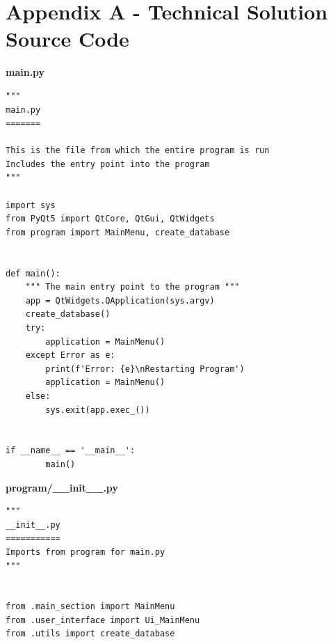 \documentclass[12pt]{article}
\begin{document}
\clearpage

\section{Appendix A - Technical Solution Source Code}
\textbf{main.py}

\begin{lstlisting}
"""
main.py
=======

This is the file from which the entire program is run
Includes the entry point into the program
"""

import sys
from PyQt5 import QtCore, QtGui, QtWidgets
from program import MainMenu, create_database


def main():
    """ The main entry point to the program """
    app = QtWidgets.QApplication(sys.argv)
    create_database()
    try:
        application = MainMenu()
    except Error as e:
        print(f'Error: {e}\nRestarting Program')
        application = MainMenu()
    else:
        sys.exit(app.exec_())


if __name__ == '__main__':
        main()
\end{lstlisting}

\textbf{program/\_\_init\_\_.py}
\begin{lstlisting}
"""
__init__.py
===========
Imports from program for main.py
"""


from .main_section import MainMenu
from .user_interface import Ui_MainMenu
from .utils import create_database
\end{lstlisting}
\end{document}
